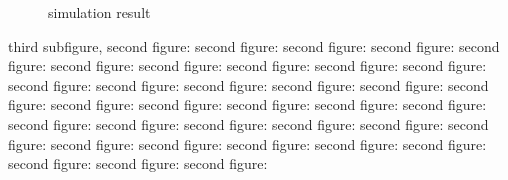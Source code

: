 \documentclass{article}
\begin{document}
    \begin{figure}[h]
      \centering



      \centering
      \caption{simulation result}\label{simulation}
    \end{figure}

    third subfigure,  second figure:  second figure:  second figure:  second figure:  second figure:  second figure:  second figure:  second figure:  second figure:  second figure:  second figure:  second figure:  second figure:  second figure:  second figure:  second figure:  second figure:  second figure:  second figure:  second figure:  second figure:  second figure:  second figure:  second figure:  second figure:  second figure:  second figure:  second figure:  second figure:  second figure:  second figure:  second figure:  second figure:  second figure:  second figure:
\end{document}
